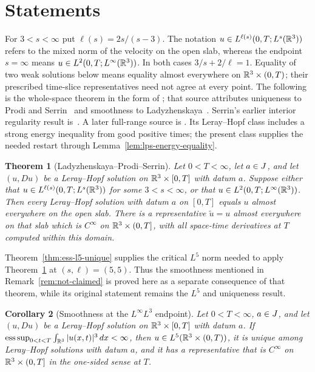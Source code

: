 \documentclass[11pt,letterpaper]{article}
\numberwithin{equation}{section}
\theoremstyle{plain}
\newtheorem{theorem}{Theorem}[section]
\newtheorem{corollary}[theorem]{Corollary}
\theoremstyle{definition}
\theoremstyle{remark}
\begin{document}
\section{Statements}\label{sec:lps-statements}

For $3<s<\infty$ put $\ell(s)=2s/(s-3)$. The notation
$u\in L^{\ell(s)}(0,T;L^s(\mathbb{R}^3))$ refers to the mixed norm of the velocity
on the open slab, whereas the endpoint $s=\infty$ means
$u\in L^2(0,T;L^\infty(\mathbb{R}^3))$. In both cases
$3/s+2/\ell=1$. Equality of two weak solutions below means equality almost
everywhere on $\mathbb{R}^3\times(0,T)$; their prescribed time-slice representatives
need not agree at every point. The following is the whole-space theorem
in the form of \cite[Theorem~1.2, printed p.~213]{ESS2003}; that source
attributes uniqueness to Prodi and Serrin~\cite{Prodi1959,Serrin1963}
and smoothness to Ladyzhenskaya~\cite{Ladyzhenskaya1967}. Serrin's
earlier interior regularity result is~\cite{Serrin1962}. A later full-range source is
\cite[Theorems~8.17 and 8.19, printed pp.~173--174]{RobinsonRodrigoSadowski2016}.
Its Leray--Hopf class includes a strong energy inequality from good positive
times; the present class supplies the needed restart through
Lemma~\ref{lem:lps-energy-equality}.

\begin{theorem}[Ladyzhenskaya--Prodi--Serrin]\label{thm:lps}
Let $0<T<\infty$, let $a\in J$, and let $(u,Du)$ be a Leray--Hopf
solution on $\mathbb{R}^3\times[0,T]$ with datum $a$. Suppose either that
$u\in L^{\ell(s)}(0,T;L^s(\mathbb{R}^3))$ for some $3<s<\infty$, or that
$u\in L^2(0,T;L^\infty(\mathbb{R}^3))$. Then every Leray--Hopf solution with
datum $a$ on $[0,T]$ equals $u$ almost everywhere on the open slab.
There is a representative $\widetilde u=u$ almost everywhere on that
slab which is $C^\infty$ on $\mathbb{R}^3\times(0,T]$, with all
space-time derivatives at $T$ computed within this domain.
\end{theorem}

Theorem~\ref{thm:ess-l5-unique} supplies the critical $L^5$ norm needed to
apply Theorem~\ref{thm:lps} at $(s,\ell)=(5,5)$. Thus the smoothness
mentioned in Remark~\ref{rem:not-claimed} is proved here as a separate
consequence of that theorem, while its original statement remains the
$L^5$ and uniqueness result.

\begin{corollary}[Smoothness at the $L^\infty L^3$ endpoint]\label{cor:ess-smooth}
Let $0<T<\infty$, $a\in J$, and let $(u,Du)$ be a Leray--Hopf solution
on $\mathbb{R}^3\times[0,T]$ with datum $a$. If
$\operatorname*{ess\,sup}_{0<t<T}\int_{\mathbb{R}^3}|u(x,t)|^3\,dx<\infty$, then
$u\in L^5(\mathbb{R}^3\times(0,T))$, it is unique among Leray--Hopf solutions
with datum $a$, and it has a representative that is $C^\infty$ on
$\mathbb{R}^3\times(0,T]$ in the one-sided sense at $T$.
\end{corollary}
\end{document}
